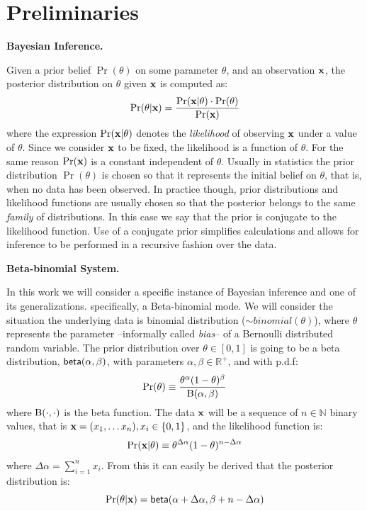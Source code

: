 \documentclass{article}
\begin{document}
\section{Preliminaries}
\label{sec_background}

\noindent \textbf{Bayesian Inference.}

Given a prior belief $\Pr(\theta)$ on some parameter $\theta$,
and an observation $\textbf{x}$, the posterior distribution on $\theta$ given $\textbf{x}$ is computed as:
\[
  \Pr(\theta | \textbf{x}) = \frac{\Pr(\textbf{x} | \theta) \cdot \Pr(\theta)}{\Pr(\textbf{x})}
\]
where the expression $\Pr(\textbf{x} | \theta)$ denotes the
\emph{likelihood} of observing $\textbf{x}$ under a value of
$\theta$. Since we consider $\textbf{x}$ to be fixed, the likelihood is
a function of $\theta$.
For the same reason $\Pr(\textbf{x})$ is a constant independent of $\theta$.
Usually in statistics the prior distribution $\Pr(\theta)$ is chosen so that it represents
the initial belief on $\theta$, that is, when no data has been observed. In practice though,
prior distributions and likelihood functions are usually chosen so that the posterior
belongs to the same \emph{family} of distributions. In this case we say that the prior
is conjugate to the likelihood function. Use of a conjugate prior
simplifies calculations and allows for inference to be performed in a
recursive fashion over the data.


\noindent \textbf{Beta-binomial System.}

In this work we will consider a specific instance of Bayesian inference and one of its generalizations.
specifically, a Beta-binomial mode. We will consider the situation the underlying data is binomial distribution ($\sim binomial(\theta)$), where $\theta$ represents
the parameter --informally called \emph{bias}-- of a Bernoulli
distributed random variable. The
prior distribution over $\theta\in [0,1]$ is going to be a beta
distribution, $\mathsf{beta}(\alpha, \beta)$, with parameters
$\alpha,\beta\in\mathbb{R}^{+}$, and with p.d.f:
\[
  \Pr(\theta)\equiv \frac{\theta^{\alpha} (1- \theta)^{\beta}}{\textup{B}(\alpha,\beta)}
\]
where $\textup{B}(\cdot,\cdot)$ is the beta function.
The data $\textbf{x}$ will be a sequence of $n\in\mathbb{N}$ binary values, that is $\textbf{x}= (x_1,\dots x_n), x_i\in\{0,1\}$, and the likelihood function is:
\[
  \Pr(\textbf{x} | \theta)\equiv \theta^{\Delta \alpha}(1-\theta)^{n - \Delta \alpha}
\]
where $\Delta \alpha = \displaystyle\sum_{i=1}^{n}x_i$.
From this it can easily be derived that the posterior distribution is:
\[
  \Pr(\theta|\textbf{x})=\mathsf{beta}(\alpha + \Delta \alpha,\beta + n - \Delta \alpha)
\]
\end{document}
